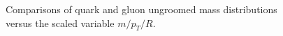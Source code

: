 \begin{figure}
\centering
{}
\caption{Comparisons of quark and gluon ungroomed mass distributions versus the scaled variable $m/p_T/R$. }
\label{fig:qg_masses_log}
\end{figure}

